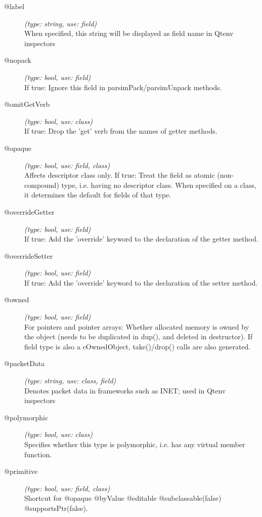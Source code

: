 \begin{description}
\item[@label] \textit{(type: string, use: field)} \\
  When specified, this string will be displayed as field name in Qtenv
  inspectors

\item[@nopack] \textit{(type: bool, use: field)} \\
  If true: Ignore this field in parsimPack/parsimUnpack methods.

\item[@omitGetVerb] \textit{(type: bool, use: class)} \\
  If true: Drop the 'get' verb from the names of getter methods.

\item[@opaque] \textit{(type: bool, use: field, class)} \\
  Affects descriptor class only. If true: Treat the field as atomic
  (non-compound) type, i.e. having no descriptor class. When specified on a
  class, it determines the default for fields of that type.

\item[@overrideGetter] \textit{(type: bool, use: field)} \\
  If true: Add the 'override' keyword to the declaration of the getter method.

\item[@overrideSetter] \textit{(type: bool, use: field)} \\
  If true: Add the 'override' keyword to the declaration of the setter method.

\item[@owned] \textit{(type: bool, use: field)} \\
  For pointers and pointer arrays: Whether allocated memory is owned by the
  object (needs to be duplicated in dup(), and deleted in destructor). If
  field type is also a cOwnedObject, take()/drop() calls are also generated.

\item[@packetData] \textit{(type: string, use: class, field)} \\
  Denotes packet data in frameworks such as INET; used in Qtenv inspectors

\item[@polymorphic] \textit{(type: bool, use: class)} \\
  Specifies whether this type is polymorphic, i.e. has any virtual member
  function.

\item[@primitive] \textit{(type: bool, use: field, class)} \\
  Shortcut for @opaque @byValue @editable @subclassable(false)
  @supportsPtr(false).


\end{description}
